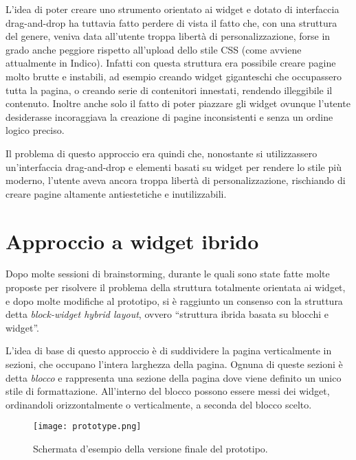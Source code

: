        	L'idea di poter creare uno strumento orientato ai widget e dotato di interfaccia drag-and-drop ha tuttavia fatto perdere di vista il fatto che, con una struttura del genere, veniva data all'utente troppa libertà di personalizzazione, forse in grado anche peggiore rispetto all'upload dello stile \ac{CSS} (come avviene attualmente in Indico). Infatti con questa struttura era possibile creare pagine molto brutte e instabili, ad esempio creando widget giganteschi che occupassero tutta la pagina, o creando serie di contenitori innestati, rendendo illeggibile il contenuto. Inoltre anche solo il fatto di poter piazzare gli widget ovunque l'utente desiderasse incoraggiava la creazione di pagine inconsistenti e senza un ordine logico preciso.
       	
       	Il problema di questo approccio era quindi che, nonostante si utilizzassero un'interfaccia drag-and-drop e elementi basati su widget per rendere lo stile più moderno, l'utente aveva ancora troppa libertà di personalizzazione, rischiando di creare pagine altamente antiestetiche e inutilizzabili.
    
    \section{Approccio a widget ibrido} \label{sec:ccp;approccio_widget_ibrido}
    
        Dopo molte sessioni di brainstorming, durante le quali sono state fatte molte proposte per risolvere il problema della struttura totalmente orientata ai widget, e dopo molte modifiche al prototipo, si è raggiunto un consenso con la struttura detta \textit{block-widget hybrid layout}, ovvero ``struttura ibrida basata su blocchi e widget''.
        
        L'idea di base di questo approccio è di suddividere la pagina verticalmente in sezioni, che occupano l'intera larghezza della pagina. Ognuna di queste sezioni è detta \textit{blocco} e rappresenta una sezione della pagina dove viene definito un unico stile di formattazione. All'interno del blocco possono essere messi dei widget, ordinandoli orizzontalmente o verticalmente, a seconda del blocco scelto.
        
       	\begin{figure}[h!]
       		\begin{center}
       			\texttt{[image: prototype.png]}
       		\end{center}
       		\caption[Versione finale del prototipo]{Schermata d'esempio della versione finale del prototipo.}
       		\label{fig:prototype}
       	\end{figure}
       	
